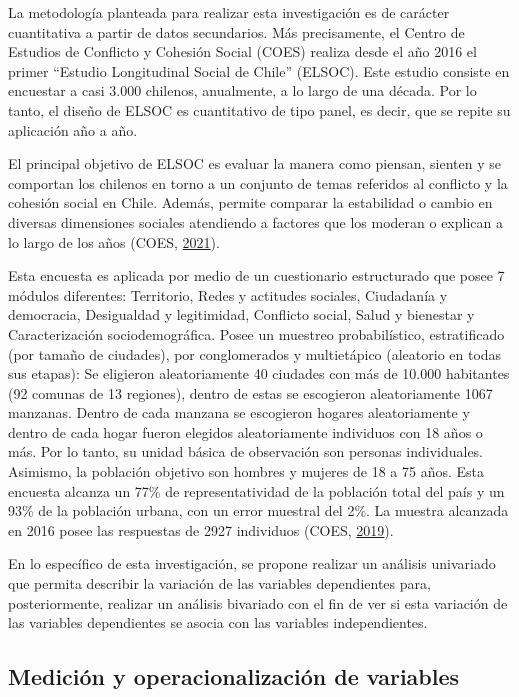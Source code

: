 \documentclass[
]{article}
\begin{document}
La metodología planteada para realizar esta investigación es de carácter
cuantitativa a partir de datos secundarios. Más precisamente, el Centro
de Estudios de Conflicto y Cohesión Social (COES) realiza desde el año
2016 el primer ``Estudio Longitudinal Social de Chile'' (ELSOC). Este
estudio consiste en encuestar a casi 3.000 chilenos, anualmente, a lo
largo de una década. Por lo tanto, el diseño de ELSOC es cuantitativo de
tipo panel, es decir, que se repite su aplicación año a año.

El principal objetivo de ELSOC es evaluar la manera como piensan,
sienten y se comportan los chilenos en torno a un conjunto de temas
referidos al conflicto y la cohesión social en Chile. Además, permite
comparar la estabilidad o cambio en diversas dimensiones sociales
atendiendo a factores que los moderan o explican a lo largo de los años
(COES, \protect\hyperlink{ref-coes_Estudio_2021}{2021}).

Esta encuesta es aplicada por medio de un cuestionario estructurado que
posee 7 módulos diferentes: Territorio, Redes y actitudes sociales,
Ciudadanía y democracia, Desigualdad y legitimidad, Conflicto social,
Salud y bienestar y Caracterización sociodemográfica. Posee un muestreo
probabilístico, estratificado (por tamaño de ciudades), por
conglomerados y multietápico (aleatorio en todas sus etapas): Se
eligieron aleatoriamente 40 ciudades con más de 10.000 habitantes (92
comunas de 13 regiones), dentro de estas se escogieron aleatoriamente
1067 manzanas. Dentro de cada manzana se escogieron hogares
aleatoriamente y dentro de cada hogar fueron elegidos aleatoriamente
individuos con 18 años o más. Por lo tanto, su unidad básica de
observación son personas individuales. Asimismo, la población objetivo
son hombres y mujeres de 18 a 75 años. Esta encuesta alcanza un 77\% de
representatividad de la población total del país y un 93\% de la
población urbana, con un error muestral del 2\%. La muestra alcanzada en
2016 posee las respuestas de 2927 individuos (COES,
\protect\hyperlink{ref-coes_Radiografia_2019}{2019}).

En lo específico de esta investigación, se propone realizar un análisis
univariado que permita describir la variación de las variables
dependientes para, posteriormente, realizar un análisis bivariado con el
fin de ver si esta variación de las variables dependientes se asocia con
las variables independientes.

\hypertarget{mediciuxf3n-y-operacionalizaciuxf3n-de-variables}{%
\subsection{Medición y operacionalización de
variables}\label{mediciuxf3n-y-operacionalizaciuxf3n-de-variables}}
\end{document}
